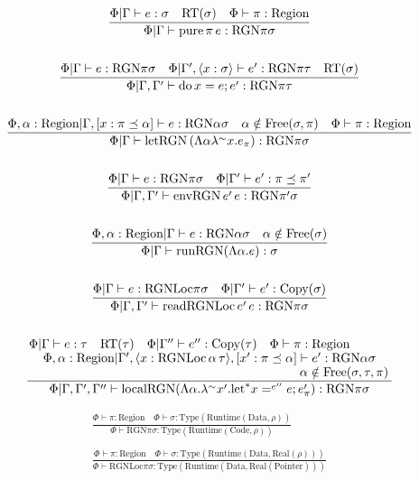 \documentclass {article}
\begin{document}
\begin{gather*}
\frac
{\Phi | \Gamma \vdash e : \sigma \quad \text{RT}(\sigma) \quad \Phi \vdash \pi : \text{Region} }
{\Phi | \Gamma \vdash \text{pure} \, \pi \, e : \text{RGN} \pi \sigma } \\
\\
\frac
{\Phi | \Gamma \vdash e : \text{RGN} \pi \sigma \quad \Phi | \Gamma', \langle x : \sigma \rangle \vdash e' : \text{RGN} \pi \tau \quad \text{RT}(\sigma) }
{\Phi | \Gamma, \Gamma' \vdash \text{do} \, x = e; e' : \text{RGN} \pi \tau} \\
\\
\frac
{\Phi , \alpha : \text{Region} | \Gamma, [x : \pi \preceq \alpha] \vdash e : \text{RGN} \alpha \sigma \quad \alpha \notin \text{Free}(\sigma, \pi) \quad \Phi \vdash \pi : \text{Region}}
{\Phi | \Gamma \vdash \text{letRGN} \, (\Lambda \alpha \lambda^\sim x. e_\pi) : \text{RGN} \pi \sigma} \\
\\
\frac
{\Phi | \Gamma \vdash e : \text{RGN} \pi \sigma \quad \Phi | \Gamma' \vdash e' : \pi \preceq \pi'}
{\Phi | \Gamma, \Gamma' \vdash \text{envRGN} \, e' \, e : \text{RGN} \pi' \sigma } \\
\\
\frac
{\Phi, \alpha : \text{Region}| \Gamma \vdash e : \text{RGN} \alpha \sigma \quad \alpha \notin \text{Free}(\sigma)}
{\Phi | \Gamma \vdash \text{runRGN} (\Lambda \alpha. e) : \sigma}\\
\\
\frac
{\Phi | \Gamma \vdash e : \text{RGNLoc} \pi \sigma \quad \Phi | \Gamma' \vdash e' : \text{Copy} (\sigma) }
{\Phi | \Gamma, \Gamma' \vdash \text{readRGNLoc} \, e' \, e : \text{RGN} \pi \sigma} \\
\\
\frac
{\splitfrac{\Phi | \Gamma \vdash e : \tau \quad \text{RT} (\tau) \quad \Phi | \Gamma'' \vdash e'' :  \text{Copy} (\tau) \quad \Phi \vdash \pi : \text{Region}}
{\splitfrac{\Phi, \alpha : \text{Region} | \Gamma', \langle x : \text{RGNLoc} \, \alpha \, \tau \rangle , [x' : \pi \preceq \alpha] \vdash e' : \text{RGN} \alpha \sigma}
{\alpha \notin \text{Free}(\sigma, \tau, \pi)}}}
{\Phi | \Gamma, \Gamma', \Gamma'' \vdash \text{localRGN} (\Lambda \alpha. \lambda^\sim x'. \text{let}^* x =^{e''} e; e'_\pi ) : \text{RGN} \pi \sigma} \\
\end{gather*}

\begin{gather*}
\frac
{\Phi \vdash \pi : \text{Region} \quad \Phi \vdash \sigma : \text{Type}(\text{Runtime}(\text{Data}, \rho))}
{\Phi \vdash \text{RGN} \pi \sigma : \text{Type}(\text{Runtime}(\text{Code}, \rho))} \\
\\
\frac
{\Phi \vdash \pi : \text{Region} \quad \Phi \vdash \sigma : \text{Type}(\text{Runtime}(\text{Data}, \text{Real}(\rho)))}
{\Phi \vdash \text{RGNLoc} \pi \sigma : \text{Type}(\text{Runtime} (\text{Data}, \text{Real}(\text{Pointer})))} \\
\end{gather*}
\end{document}
